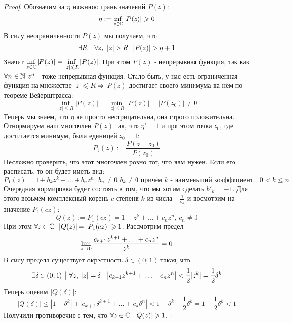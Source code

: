 \begin{proof}
	Обозначим за $\eta$ нижнюю грань значений $P(z)$:
	\[
		\eta := \inf\limits_{z \in \mathbb{C}} |P(z)| \geqslant 0
	\]
	В силу неограниченности $P(z)$ мы получаем, что
	\[
		\exists R \ \big|\  \forall z,\ |z| > R\ \ |P(z)| > \eta + 1
	\]
	Значит $\inf\limits_{z \in \mathbb{C}} |P(z)| = \inf\limits_{|z| \leqslant R} |P(z)|$. При этом $P(z)$ - непрерывная функция, так как $\forall n \in \mathbb{N}\ z^n$ - тоже непрерывная функция. Стало быть, у нас есть ограниченная функция на множестве $|z| \leqslant R \Rightarrow $ $P(z)$ достигает своего минимума на нём по теореме Вейерштрасса: 
	\[
		\inf\limits_{|z| \le R} |P(z)| = \min\limits_{|z| \le R} |P(z)| = |P(z_0)| \neq 0
	\]
	Теперь мы знаем, что $\eta$ не просто неотрицательна, она строго положительна. Отнормируем наш многочлен $P(z)$ так, что $\eta' = 1$ и при этом точка $z_0$, где достигается минимум, была единицей $z_0 = 1$:
	\[
		P_1(z) := \frac{P(z + z_0)}{P(z_0)}
	\]
	Несложно проверить, что этот многочлен ровно тот, что нам нужен. Если его расписать, то он будет иметь вид:
	\[
		P_1(z) = 1 + b_k z^k + \ldots + b_n z^n,\ b_n \neq 0, b_k \neq 0 \text{ причём } k \text{ - наименьший коэффициент },\ 0 < k \le n
	\]
	Очередная нормировка будет состоять в том, что мы хотим сделать $b'_k = -1$. Для этого возьмём комплексный корень $c$ степени $k$ из числа $-\frac{1}{b_k}$ и посмотрим на значение $P_1(cz)$:
	\[
		Q(z) := P_1(cz) = 1 - z^k + \ldots + c_n z^n,\ c_n \neq 0
	\]
	При этом $\forall z \in \mathbb{C}\ \ |Q(z)| = |P_1(cz)| \geqslant 1$. Рассмотрим предел
	\[
		\lim\limits_{z \to 0} \frac{c_{k + 1} z^{k + 1} + \ldots + c_n z^n}{z^k} = 0
	\]
	В силу предела существует окрестность $\delta \in (0; 1)$ такая, что
	\[
		\exists \delta \in (0; 1) \ \big|\  \forall z,\ |z| = \delta\ \ \left|c_{k + 1}z^{k + 1} + \ldots + c_n z^n\right| < \frac{1}{2}|z^k| = \frac{1}{2}\delta^k
	\]
	Теперь оценим $|Q(\delta)|$:
	\[
		|Q(\delta)| \le |1 - \delta^k| + |c_{k + 1}\delta^{k + 1} + \ldots + c_n \delta^n| < 1 - \delta^k + \frac{1}{2}\delta^k = 1 - \frac{1}{2}\delta^k < 1
	\]
	Получили противоречие с тем, что $\forall z \in \mathbb{C}\ \ |Q(z)| \geqslant 1$.
\end{proof}